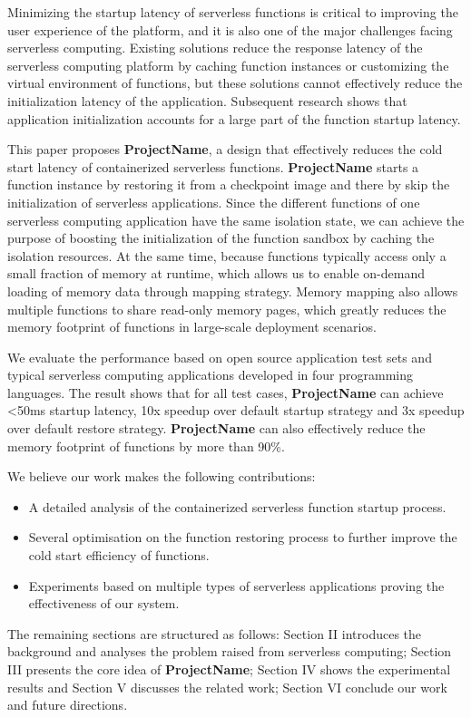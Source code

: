 Minimizing the startup latency of serverless functions is critical to improving the user experience of the platform\cite{serverless-user-experience-1,serverless-user-experience-2},
and it is also one of the major challenges facing serverless computing\cite{berkeley-view,serverless-trends}.
Existing solutions reduce the response latency of the serverless computing platform by caching function instances\cite{pool1,pool2} or customizing the virtual environment of functions\cite{firecracker,faasm},
but these solutions cannot effectively reduce the initialization latency of the application.
Subsequent research shows that application initialization accounts for a large part of the function startup latency.


This paper proposes \textbf{ProjectName}, 
a design that effectively reduces the cold start latency of containerized serverless functions. 
\textbf{ProjectName} starts a function instance by restoring it from a checkpoint image and there by skip the initialization of serverless applications. 
Since the different functions of one serverless computing application have the same isolation state, 
we can achieve the purpose of boosting the initialization of the function sandbox by caching the isolation resources. 
At the same time, because functions typically access only a small fraction of memory at runtime, 
which allows us to enable on-demand loading of memory data through mapping strategy. 
Memory mapping also allows multiple functions to share read-only memory pages, 
which greatly reduces the memory footprint of functions in large-scale deployment scenarios.

We evaluate the performance based on open source application test sets and typical serverless computing applications developed in four programming languages.
The result shows that for all test cases, \textbf{ProjectName} can achieve <50ms startup latency, 
10x speedup over default startup strategy 
and 3x speedup over default restore strategy. 
\textbf{ProjectName} can also effectively reduce the memory footprint of 
functions by more than 90\%.

We believe our work makes the following contributions:

\begin{itemize}
    \item A detailed analysis of the containerized serverless function startup process.
    \item Several optimisation on the function restoring process to further improve the cold start efficiency of functions.
    \item Experiments based on multiple types of serverless applications proving the effectiveness of our system.
\end{itemize}


The remaining sections are structured as follows: 
Section II introduces the background and analyses the problem raised from serverless computing; 
Section III presents the core idea of \textbf{ProjectName}; 
Section IV shows the experimental results and Section V discusses the related work; 
Section VI conclude our work and future directions.